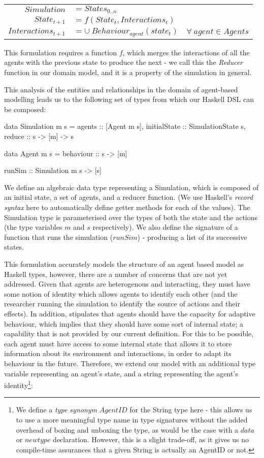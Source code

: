 \documentclass[a4paper, 11pt]{article}
\begin{document}
\begin{tabular}{r l l}
    $Simulation$         &  $= States_{0..n}$\\
    $State_{t+1}$        &  $= f(State_{t}, Interactions_{t})$\\
    $Interactions_{t+1}$ &  $= \cup \: Behaviour_{agent}(state_{t})$ & $\forall  \: agent \in Agents$
\end{tabular}

This formulation requires a function $f$, which merges the interactions of all the agents with the previous state to produce the next - we call this the \emph{Reducer} function in our domain model, and it is a property of the simulation in general.

This analysis of the entities and relationships in the domain of agent-based modelling leads us to the following set of types from which our Haskell DSL can be composed:

\begin{code}
  data Simulation m s = { 
    agents :: [Agent m s],
    initialState :: SimulationState s, 
    reduce :: s -> [m] -> s
  }
  
  data Agent m s = { 
    behaviour :: s -> [m]
  }
  
  runSim :: Simulation m s -> [s]

\end{code}

We define an algebraic data type representing a Simulation, which is composed of an initial state, a set of agents, and a reducer function. (We use Haskell's \emph{record syntax} here to automatically define getter methods for each of the values). The Simulation type is parameterised over the types of both the state and the actions (the type variables $m$ and $s$ respectively).
We also define the signature of a function that runs the simulation ($runSim$) - producing a list of its successive states.

This formulation accurately models the structure of an agent based model as Haskell types, however, there are a number of concerns that are not yet addressed. Given that agents are heterogenous and interacting, they must have some notion of identity which allows agents to identify each other (and the researcher running the simulation to identify the source of actions and their effects). In addition, \cite{Macal2010} stipulates that agents should have the capacity for adaptive behaviour, which implies that they should have some sort of internal state; a capability that is not provided by our current definition. For this to be possible, each agent must have access to some internal state that allows it to store information about its environment and interactions, in order to adapt its behaviour in the future. Therefore, we extend our model with an additional type variable representing an agent's state, and a string representing the agent's identity\footnote{We define a \emph{type synonym} $AgentID$ for the String type here - this allows us to use a more meaningful type name in type signatures without the added overhead of boxing and unboxing the type, as would be the case with a $data$ or $newtype$ declaration. However, this is a slight trade-off, as it gives us no compile-time assurances that a given String is actually an AgentID or not.}:
\end{document}
